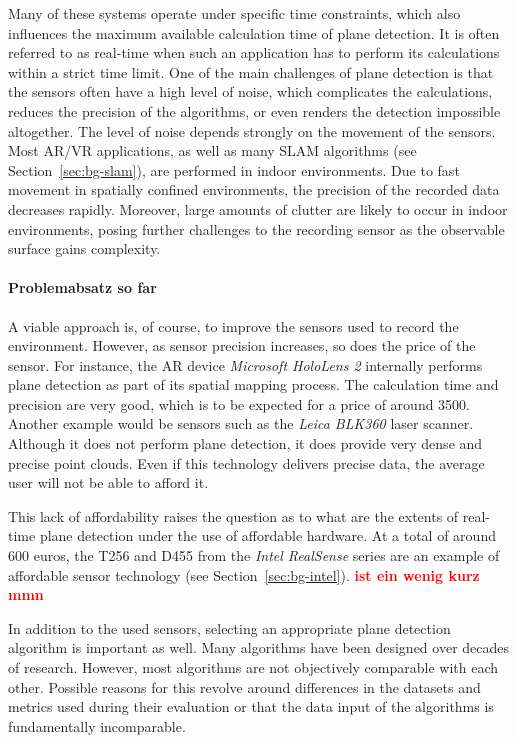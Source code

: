 \documentclass[main.tex]{subfiles}
\begin{document}
Many of these systems operate under specific time constraints, which also influences the maximum available calculation time of plane detection. 
It is often referred to as real-time when such an application has to perform its calculations within a strict time limit. 
One of the main challenges of plane detection is that the sensors often have a high level of noise, which complicates the calculations, 
reduces the precision of the algorithms, or even renders the detection impossible altogether. 
The level of noise depends strongly on the movement of the sensors. 
Most AR/VR applications, as well as many SLAM algorithms (see Section~\ref{sec:bg-slam}), are performed in indoor environments. 
Due to fast movement in spatially confined environments, the precision of the recorded data decreases rapidly.
Moreover, large amounts of clutter are likely to occur in indoor environments, posing further challenges 
to the recording sensor as the observable surface gains complexity.

\paragraph{Problemabsatz so far}
A viable approach is, of course, to improve the sensors used to record the environment. However, as sensor precision increases, so does the price of the sensor. 
For instance, the AR device \textit{Microsoft HoloLens 2} internally performs plane detection as part of its spatial mapping process. 
The calculation time and precision are very good, which is to be expected for a price of around 3500. Another example would be sensors such as the \textit{Leica BLK360} 
laser scanner. Although it does not perform plane detection, it does provide very dense and precise point clouds. Even if this technology delivers precise data, 
the average user will not be able to afford it.

This lack of affordability raises the question as to what are the extents of real-time plane detection under the use of affordable hardware.
At a total of around 600 euros, the T256 and D455 from the \textit{Intel RealSense} series are an example of affordable sensor technology (see Section~\ref{sec:bg-intel}).
\textbf{\textcolor{red}{ist ein wenig kurz mmn}}


In addition to the used sensors, selecting an appropriate plane detection algorithm is important as well. 
Many algorithms have been designed over decades of research. 
However, most algorithms are not objectively comparable with each other. 
Possible reasons for this revolve around differences in the datasets and metrics used 
during their evaluation or that the data input of the algorithms is fundamentally incomparable.
\end{document}
